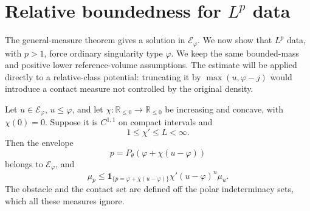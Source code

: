 \section{Relative boundedness for \texorpdfstring{$L^p$}{Lp} data}
\label{sec:big-model-lp}

The general-measure theorem gives a solution in $\mathcal E_\varphi$. We now show that $L^p$ data, with $p>1$, force ordinary singularity type $\varphi$. We keep the same bounded-mass and positive lower reference-volume assumptions. The estimate will be applied directly to a relative-class potential: truncating it by $\max(u,\varphi-j)$ would introduce a contact measure not controlled by the original density.

\begin{lemma}\label{lem:big-model-concave-envelope}
Let $u\in\mathcal E_\varphi$, $u\leq\varphi$, and let
$\chi:\mathbb R_{\leq0}\to\mathbb R_{\leq0}$ be increasing and concave, with $\chi(0)=0$. Suppose it is $C^{1,1}$ on compact intervals and
\[
 1\leq\chi'\leq L<\infty.
\]
Then the envelope
\[
 p=P_\theta(\varphi+\chi(u-\varphi))
\]
belongs to $\mathcal E_\varphi$, and
\[
 \mu_p\leq\mathbf1_{\{p=\varphi+\chi(u-\varphi)\}}
                 \chi'(u-\varphi)^n\mu_u.
\]
The obstacle and the contact set are defined off the polar indeterminacy sets, which all these measures ignore.
\end{lemma}
